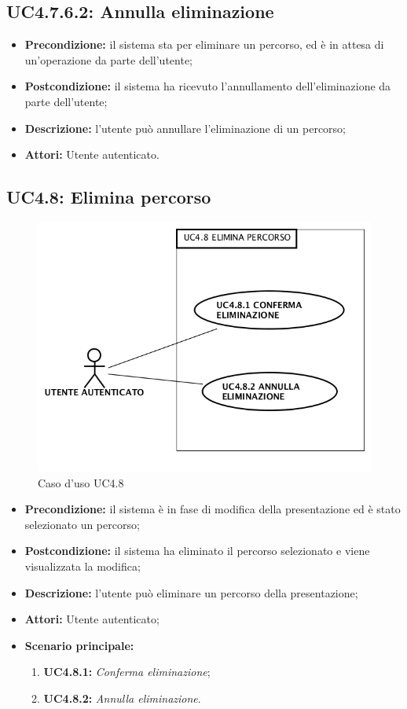 \subsection{ UC4.7.6.2: Annulla eliminazione}

\begin{itemize}
	\item \textbf{Precondizione:} il sistema sta per eliminare un percorso, ed è in attesa di un'operazione da parte dell'utente;
	\item \textbf{Postcondizione:} il sistema ha ricevuto l'annullamento dell'eliminazione da parte dell'utente;
	\item \textbf{Descrizione:} l'utente può annullare l'eliminazione di un percorso;
	\item \textbf{Attori:} Utente autenticato.
\end{itemize}
\subsection{ UC4.8: Elimina percorso}

\begin{figure}[H]
	\begin{center}
	\includegraphics[scale=0.4]{diagram/UC4-8.png}
	\caption{Caso d'uso UC4.8}
	\end{center}
\end{figure}
\begin{itemize}
	\item \textbf{Precondizione:} il sistema è in fase di modifica della presentazione ed è stato selezionato un percorso;
	\item \textbf{Postcondizione:} il sistema ha eliminato il percorso selezionato e viene visualizzata la modifica;
	\item \textbf{Descrizione:} l'utente può eliminare un percorso della presentazione;
	\item \textbf{Attori:} Utente autenticato;
	\item \textbf{Scenario principale:}
	\begin{enumerate}
		\item \textbf{ UC4.8.1:} \textit{ Conferma eliminazione};
		\item \textbf{ UC4.8.2:} \textit{ Annulla eliminazione}.
	\end{enumerate}
\end{itemize}
